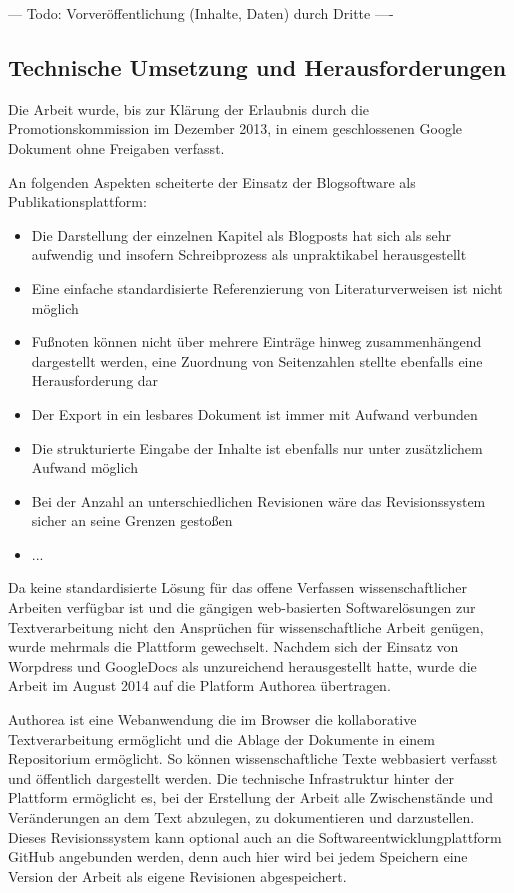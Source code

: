 --- Todo: Vorveröffentlichung (Inhalte, Daten) durch Dritte ----

\subsection{Technische Umsetzung und Herausforderungen}

Die Arbeit wurde, bis zur Klärung der Erlaubnis durch die Promotionskommission im Dezember 2013, in einem geschlossenen Google Dokument ohne Freigaben verfasst.

An folgenden Aspekten scheiterte der Einsatz der Blogsoftware als Publikationsplattform:
\begin{itemize}
\item Die Darstellung der einzelnen Kapitel als Blogposts hat sich als sehr aufwendig und insofern Schreibprozess als unpraktikabel herausgestellt
\item Eine einfache standardisierte Referenzierung von Literaturverweisen ist nicht möglich
\item Fußnoten können nicht über mehrere Einträge hinweg zusammenhängend dargestellt werden, eine Zuordnung von Seitenzahlen stellte ebenfalls eine Herausforderung dar
\item Der Export in ein lesbares Dokument ist immer mit Aufwand verbunden
\item Die strukturierte Eingabe der Inhalte ist ebenfalls nur unter zusätzlichem Aufwand möglich
\item Bei der Anzahl an unterschiedlichen Revisionen wäre das Revisionssystem sicher an seine Grenzen gestoßen
\item ...
\end{itemize}

Da keine standardisierte Lösung für das offene Verfassen wissenschaftlicher Arbeiten verfügbar ist und die gängigen web-basierten Softwarelösungen zur Textverarbeitung nicht den Ansprüchen für wissenschaftliche Arbeit genügen, wurde mehrmals die Plattform gewechselt. Nachdem sich der Einsatz von Worpdress und GoogleDocs als unzureichend herausgestellt hatte, wurde die Arbeit im August 2014 auf die Platform Authorea übertragen.

Authorea ist eine Webanwendung die im Browser die kollaborative Textverarbeitung ermöglicht und die Ablage der Dokumente in einem Repositorium ermöglicht. So können wissenschaftliche Texte webbasiert verfasst und öffentlich dargestellt werden. Die technische Infrastruktur hinter der Plattform ermöglicht es, bei der Erstellung der Arbeit alle Zwischenstände und Veränderungen an dem Text abzulegen, zu dokumentieren und darzustellen. Dieses Revisionssystem kann optional auch an die Softwareentwicklungplattform GitHub angebunden werden, denn auch hier wird bei jedem Speichern eine Version der Arbeit als eigene Revisionen abgespeichert.

